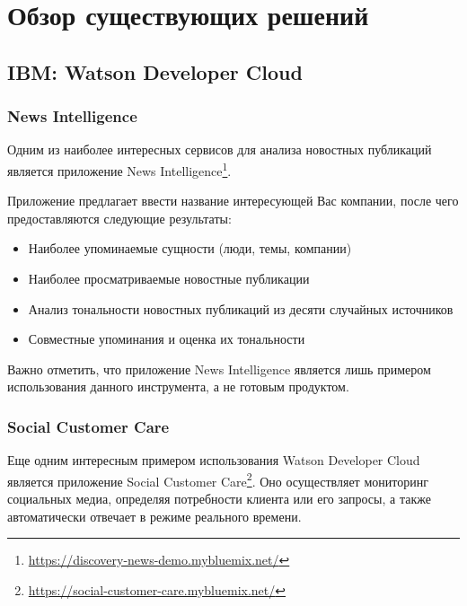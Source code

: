 \section{Обзор существующих решений}

\subsection{IBM: Watson Developer Cloud}

\subsubsection{News Intelligence}

Одним из наиболее интересных сервисов для анализа новостных публикаций является приложение News Intelligence\footnote{\url{https://discovery-news-demo.mybluemix.net/}}.

Приложение предлагает ввести название интересующей Вас компании, после чего предоставляются следующие результаты:

\begin{itemize}

\item Наиболее упоминаемые сущности (люди, темы, компании)

\item Наиболее просматриваемые новостные публикации

\item Анализ тональности новостных публикаций из десяти случайных источников

\item Совместные упоминания и оценка их тональности

\end{itemize}

Важно отметить, что приложение News Intelligence является лишь примером использования данного инструмента, а не готовым продуктом.

\subsubsection{Social Customer Care}

Еще одним интересным примером использования Watson Developer Cloud является приложение Social Customer Care\footnote{\url{https://social-customer-care.mybluemix.net/}}. Оно осуществляет мониторинг социальных медиа, определяя потребности клиента или его запросы, а также автоматически отвечает в режиме реального времени.

